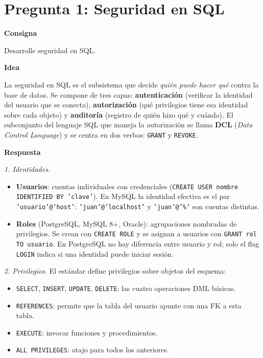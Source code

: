 \documentclass[11pt,a4paper]{article}
\newcommand{\itemcabecera}[1]{\noindent\textbf{#1}\par\medskip}
\newcommand{\bloqueConsigna}{\itemcabecera{Consigna}}
\newcommand{\bloqueIdea}{\itemcabecera{Idea}}
\newcommand{\bloqueRespuesta}{\itemcabecera{Respuesta}}
\begin{document}
\section{Pregunta 1: Seguridad en SQL}

\bloqueConsigna

Desarrolle seguridad en SQL.

\bloqueIdea

La seguridad en SQL es el subsistema que decide \emph{quién puede hacer qué} contra la base de datos. Se compone de tres capas: \textbf{autenticación} (verificar la identidad del usuario que se conecta), \textbf{autorización} (qué privilegios tiene esa identidad sobre cada objeto) y \textbf{auditoría} (registro de quién hizo qué y cuándo). El subconjunto del lenguaje SQL que maneja la autorización se llama \textbf{DCL} (\emph{Data Control Language}) y se centra en dos verbos: \texttt{GRANT} y \texttt{REVOKE}.

\bloqueRespuesta

\textit{1. Identidades.}

\begin{itemize}
    \item \textbf{Usuarios}: cuentas individuales con credenciales (\texttt{CREATE USER nombre IDENTIFIED BY 'clave'}). En MySQL la identidad efectiva es el par \texttt{'usuario'@'host'}: \texttt{'juan'@'localhost'} y \texttt{'juan'@'\%'} son cuentas distintas.
    \item \textbf{Roles} (PostgreSQL, MySQL 8+, Oracle): agrupaciones nombradas de privilegios. Se crean con \texttt{CREATE ROLE} y se asignan a usuarios con \texttt{GRANT rol TO usuario}. En PostgreSQL no hay diferencia entre usuario y rol; solo el flag \texttt{LOGIN} indica si una identidad puede iniciar sesión.
\end{itemize}

\textit{2. Privilegios.} El estándar define privilegios sobre objetos del esquema:

\begin{itemize}
    \item \texttt{SELECT}, \texttt{INSERT}, \texttt{UPDATE}, \texttt{DELETE}: las cuatro operaciones DML básicas.
    \item \texttt{REFERENCES}: permite que la tabla del usuario apunte con una FK a esta tabla.
    \item \texttt{EXECUTE}: invocar funciones y procedimientos.
    \item \texttt{ALL PRIVILEGES}: atajo para todos los anteriores.
\end{itemize}
\end{document}
